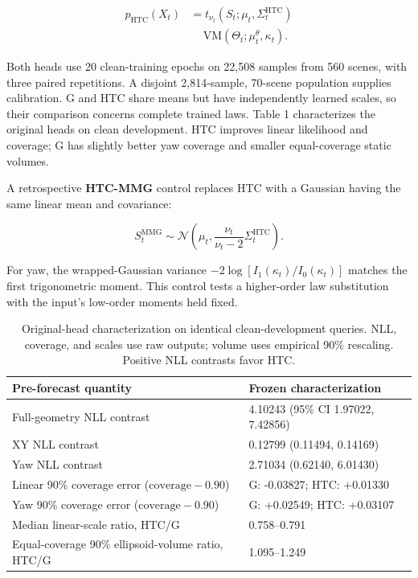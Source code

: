 \documentclass[lettersize,journal]{IEEEtran}
\begin{document}
\begin{equation}
\label{eq:htc-perception-law}
\begin{aligned}
p_{\mathrm{HTC}}(X_t) &=t_{\nu_t}(S_t;\mu_t,\Sigma_t^{\mathrm{HTC}}) \\[-1pt]
&\quad {}\,\mathrm{VM}(\Theta_t;\mu_t^\theta,\kappa_t).
\end{aligned}
\end{equation}

Both heads use 20 clean-training epochs on 22,508 samples from 560 scenes, with three paired repetitions. A disjoint 2,814-sample, 70-scene population supplies calibration. G and HTC share means but have independently learned scales, so their comparison concerns complete trained laws. Table 1 characterizes the original heads on clean development. HTC improves linear likelihood and coverage; G has slightly better yaw coverage and smaller equal-coverage static volumes.

A retrospective \textbf{HTC-MMG} control replaces HTC with a Gaussian having the same linear mean and covariance:

\begin{equation}
\label{eq:moment-matched-law}
S_t^{\mathrm{MMG}}\sim\mathcal N\!\left(\mu_t,\frac{\nu_t}{\nu_t-2}\Sigma_t^{\mathrm{HTC}}\right).
\end{equation}

For yaw, the wrapped-Gaussian variance \(-2\log[I_1(\kappa_t)/I_0(\kappa_t)]\) matches the first trigonometric moment. This control tests a higher-order law substitution with the input's low-order moments held fixed.

\begin{table}[!t]
\caption{Original-head characterization on identical clean-development queries. NLL, coverage, and scales use raw outputs; volume uses empirical 90\% rescaling. Positive NLL contrasts favor HTC.}
\label{tab:table1}
\centering
\footnotesize
\setlength{\tabcolsep}{3pt}
\renewcommand{\arraystretch}{1.15}
\begin{tabularx}{\textwidth}{@{}YY@{}}
\toprule
\textbf{Pre-forecast quantity} & \textbf{Frozen characterization} \\
\midrule
Full-geometry NLL contrast & 4.10243 (95\% CI 1.97022, 7.42856) \\
XY NLL contrast & 0.12799 (0.11494, 0.14169) \\
Yaw NLL contrast & 2.71034 (0.62140, 6.01430) \\
Linear 90\% coverage error (\(\mathrm{coverage}-0.90\)) & G: -0.03827; HTC: +0.01330 \\
Yaw 90\% coverage error (\(\mathrm{coverage}-0.90\)) & G: +0.02549; HTC: +0.03107 \\
Median linear-scale ratio, HTC/G & 0.758--0.791 \\
Equal-coverage 90\% ellipsoid-volume ratio, HTC/G & 1.095--1.249 \\
\bottomrule
\end{tabularx}
\end{table}
\end{document}
